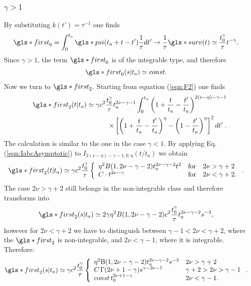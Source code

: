 \subsubsection{$\gamma>1$}
By substituting $k(t')=\tau^{-1}$ one finds 
\begin{equation}
 \gls*{first}_0 = \int_0^{t_a} \gls*{psi}(t_a + t- t') \frac{1}{\tau} dt' \to \frac{1}{\tau} \gls*{surv}(t) \simeq \frac{t_0^\gamma}{\tau} t^{-\gamma}.
\end{equation}
Since $\gamma > 1$, the term $\gls*{first}_0$ is of the integrable type, and therefore
\begin{equation}
 \gls*{first}_0(s|t_a) \simeq const. 
\end{equation}
Now we turn to $\gls*{first}_2$.  Starting from equation (\ref{eqn:F2}) one finds 
\begin{align}
&& \gls*{first}_{2}(t|t_a) \simeq   \gamma c^2 \frac{t_0^{\gamma} }{\tau}  t_a^{2\nu-\gamma-1}\int^{t_a}_0 \left(1+\frac{t}{t_a}-\frac{t'}{t_a} \right)^{2(\nu-\eta)-\gamma-1} \nonumber \\
&& \qquad \times \left[ \left(1+\frac{t}{t_a}-\frac{t'}{t_a} \right)^\eta-\left(1- \frac{t'}{t_a}\right)^\eta \right]^2  dt' \; .
\end{align}
The calculation is similar to the one in the case $\gamma<1$. By applying Eq.(\ref{eqn:IabcAsymptotic}) to $I_{2(\nu-\eta)-\gamma-1,0,\eta}(t/t_a)$ we obtain 
%
\begin{align}
\gls*{first}_{2}(t|t_a) \simeq  \gamma c^2 \frac{ t_0^{\gamma} }{\tau}    \left\{ \begin{array}{l l l}
\eta^2 B(1, 2\nu -\gamma -2) t_a^{2\nu-\gamma-2}t^2  &\mathrm{for} & 2\nu> \gamma+2\\
 C \cdot t^{2\nu-\gamma} & \mathrm{for} & 2\nu < \gamma+2.
\end{array} \right. .
\end{align}
%
The case $2\nu> \gamma+2$ still belongs in the non-integrable class and therefore transforms into 
\begin{equation}
\gls*{first}_{2}(s|t_a) \simeq 2 \gamma \eta^2 B(1,2\nu -\gamma -2) c^2 \frac{t_0^{\gamma}}{\tau}   t_a^{2\nu-\gamma-2}  s^{-3} ,
\end{equation}
however for $2\nu < \gamma+2$ we have to distinguish between $\gamma -1 < 2\nu < \gamma+2$, where the $\gls*{first}_2$ is non-integrable, and $2\nu < \gamma -1$, where it is integrable. 
Therefore:
\begin{align}
 \gls*{first}_{2}(s|t_a) \simeq \gamma  c^2\frac{ t_0^{\gamma}}{\tau}  \left\{ \begin{array}{l l l}
\eta^2\mathrm{B}(1,2\nu-\gamma-2) t_a^{2\nu-\gamma-2}  s^{-3} & 2\nu> \gamma+2\\
C \, \Gamma(2\nu+1-\gamma) s^{\gamma-2\nu-1} & \gamma+2> 2\nu > \gamma -1\\
const\,t_0^{2\nu+1-\gamma } & 2\nu < \gamma -1.
\end{array} \right.  .
\end{align}


